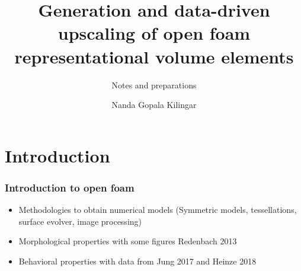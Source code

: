 \documentclass[aspectratio=169,11pt]{beamer}
\begin{document}
	\author[Kilingar]{Nanda Gopala Kilingar}
	\title[]{Generation and data-driven upscaling of
		open foam representational volume elements}
	\subtitle{Notes and preparations}
	\date{}
	\begin{frame}[plain]
	\maketitle
\end{frame}

\section{Introduction}
\begin{frame}
\frametitle{Introduction to open foam}
\begin{itemize}
\item Methodologies to obtain numerical models (Symmetric models, tessellations, surface evolver, image processing)
\item Morphological properties with some figures Redenbach 2013
\item Behavioral properties with data from Jung 2017 and Heinze 2018
\end{itemize}
\end{frame}
\end{document}
